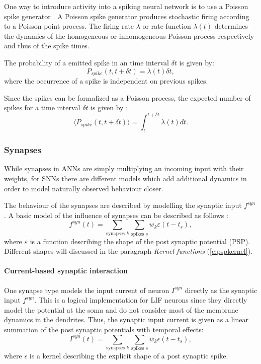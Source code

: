 One way to introduce activity into a spiking neural network is to use a Poisson spike generator \cite{Heeger2000}.
A Poisson spike generator produces stochastic firing according to a Poisson point process.
The firing rate $\lambda$ or rate function $\lambda(t)$ determines the dynamics of the homogeneous or inhomogeneous Poisson process respectively and thus of the spike times.   

The probability of a emitted spike in an time interval $\delta t$ is given by: 
\[
P_{spike}({t , t+ \delta t}) = \lambda(t) \delta t,
\]
where the occurrence of a spike is independent on previous spikes. 

Since the spikes can be formalized as a Poisson process, the expected number of spikes for a time interval $\delta t$ is given by :
\[
\langle  P_{spike}({t , t+ \delta t}) \rangle = \int_t^{t + \delta t} \lambda(t) dt.
\]


\subsubsection{Synapses} \label{c:synapses}

While synapses in ANNs are simply multiplying an incoming input with their weights, for SNNs there are different models which add additional dynamics in order to model naturally observed behaviour closer. 

The behaviour of the synapses are described by modelling the synaptic input $f^{syn}$. A basic model of the influence of synapses can be described as follows \cite{Petrovici2016}:
\[
f^{syn}(t) = \sum_{\text{synapses } k } \sum_{\text{spikes } s} w_k \varepsilon(t - t_s),
\]
where $\varepsilon$ is a function describing the shape of the post synaptic potential (PSP).
Different shapes will discussed in the paragraph \textit{Kernel functions} (\ref{c:pspkernel}).

\paragraph{Current-based synaptic interaction} \label{c:cuba}
One synapse type models the input current of neuron $I^{syn}$ directly as the synaptic input $f^{syn}$. This is a logical implementation for LIF neurons since they directly model the potential at the soma and do not consider most of the membrane dynamics in the dendrites. 
Thus, the synaptic input current is given as a linear summation of the post synaptic potentials with temporal effects:
\[
I^{syn}(t) = \sum_{\text{synapses } k } \sum_{\text{spikes } s} w_k \epsilon(t - t_s),
\]
where $\epsilon$ is a kernel describing the explicit shape of a post synaptic spike.

